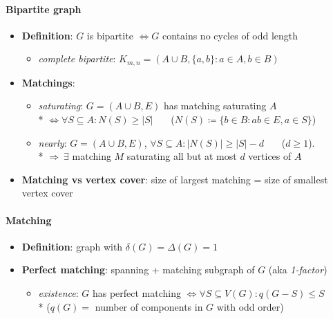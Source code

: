 \paragraph{Bipartite graph}
\begin{itemize}
  \item \textbf{Definition}: $ G $ is bipartite $ \Leftrightarrow G $ contains no cycles of odd length
  \begin{itemize}
    \item \emph{complete bipartite}: $ K_{m,n} = (A \cup B, \{ a,b \} : a \in A, b \in B) $ 
  \end{itemize}
  \item \textbf{Matchings}:
  \begin{itemize}
    \item \emph{saturating}: $ G = (A \cup B, E) $ has matching saturating $ A $ \\*
       $\Leftrightarrow \forall S \subseteq A : N(S) \geq \vert S \vert $ \ \ \ ($ N(S) \coloneqq \{ b \in B : ab \in E, a \in S \} $)
    \item \emph{nearly}: $ G = (A \cup B, E) $, $ \forall S \subseteq A : \vert N(S) \vert \geq \vert S \vert - d $ \ \ \  ($ d \geq 1 $). \\*
       $ \Rightarrow \ \exists $ matching $ M $ saturating all but at most $ d $ vertices of $ A $
  \end{itemize}
  \item \textbf{Matching vs vertex cover}: size of largest matching = size of smallest vertex cover
\end{itemize}

\paragraph{Matching}
\begin{itemize}
  \item \textbf{Definition}: graph with $ \delta(G) = \Delta(G) = 1 $ 
  \item \textbf{Perfect matching}: spanning + matching subgraph of $ G $ (aka \emph{1-factor})
  \begin{itemize}
    \item \emph{existence}: $ G $ has perfect matching $ \Leftrightarrow \forall S \subseteq V(G) : q(G-S) \leq S $ \\*
      ($ q(G) = $ number of components in $ G $ with odd order) 
  \end{itemize}
\end{itemize}


